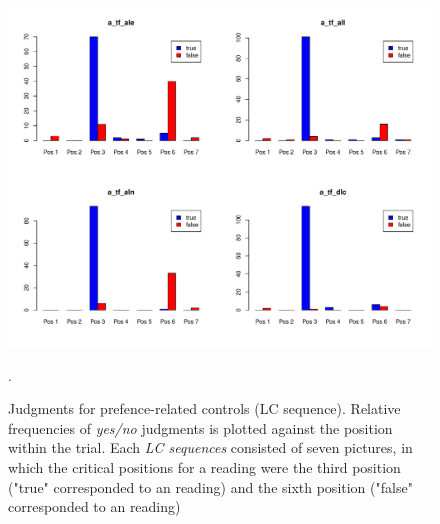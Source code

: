 \documentclass[fleqn,reqno,10pt,draft]{article}
\newcommand{\lc}{\acro{lc}}
\newcommand{\ec}{\acro{ec}}
\begin{document}

\begin{figure}
\includegraphics[width=\textwidth]{../pictures/paper/graph_lc.pdf}
\caption{Judgments for prefence-related controls (LC sequence). Relative frequencies
of {\it yes/no} judgments is plotted against the position within the
trial. Each {\it LC sequences} consisted of seven pictures, in which the
critical positions for a reading were the third position ("true" corresponded
to an \lc reading) and the sixth position ("false" corresponded to an \ec reading)}
\label{Fig:LC_judgments}.
\end{figure}




\end{document}
